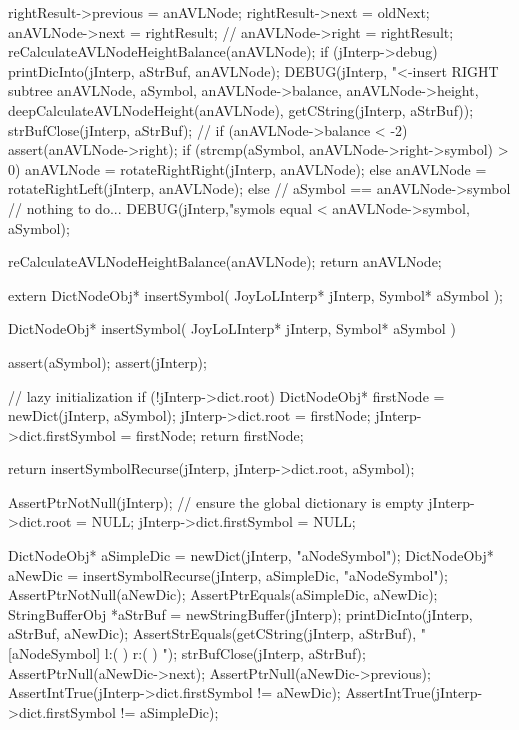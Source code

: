 {{{      rightResult->previous          = anAVLNode;
      rightResult->next              = oldNext;
      anAVLNode->next                = rightResult;
      //
    }
    anAVLNode->right = rightResult;
    reCalculateAVLNodeHeightBalance(anAVLNode);
    if (jInterp->debug) {
      printDicInto(jInterp, aStrBuf, anAVLNode);
      DEBUG(jInterp, "<-insert RIGHT subtree %
          anAVLNode, aSymbol, anAVLNode->balance,
          anAVLNode->height, deepCalculateAVLNodeHeight(anAVLNode),
          getCString(jInterp, aStrBuf));
      strBufClose(jInterp, aStrBuf);
    }
    //
    if (anAVLNode->balance < -2) {
      assert(anAVLNode->right);
      if (strcmp(aSymbol, anAVLNode->right->symbol) > 0) {
        anAVLNode = rotateRightRight(jInterp, anAVLNode);
      } else {
        anAVLNode = rotateRightLeft(jInterp, anAVLNode);
      }
    }
  } else {
    // aSymbol == anAVLNode->symbol // nothing to do...
    DEBUG(jInterp,"symols equal <%
          anAVLNode->symbol, aSymbol);
  }

  reCalculateAVLNodeHeightBalance(anAVLNode);
  return anAVLNode;
}
\stopCCode

\startCHeader
extern DictNodeObj* insertSymbol(
  JoyLoLInterp* jInterp,
  Symbol* aSymbol
);
\stopCHeader
{}

\startCCode
DictNodeObj* insertSymbol(
  JoyLoLInterp* jInterp,
  Symbol* aSymbol
) {
  assert(aSymbol);
  assert(jInterp);

  // lazy initialization
  if (!jInterp->dict.root) {
    DictNodeObj* firstNode = newDict(jInterp, aSymbol);
    jInterp->dict.root        = firstNode;
    jInterp->dict.firstSymbol = firstNode;
    return firstNode;
  }

  return insertSymbolRecurse(jInterp, jInterp->dict.root, aSymbol);
}
\stopCCode

\startCTest
  AssertPtrNotNull(jInterp);
  // ensure the global dictionary is empty
  jInterp->dict.root        = NULL;
  jInterp->dict.firstSymbol = NULL;
  
  DictNodeObj* aSimpleDic = newDict(jInterp, "aNodeSymbol");
  DictNodeObj* aNewDic = insertSymbolRecurse(jInterp, aSimpleDic, "aNodeSymbol");
  AssertPtrNotNull(aNewDic);
  AssertPtrEquals(aSimpleDic, aNewDic);
  StringBufferObj *aStrBuf = newStringBuffer(jInterp);
  printDicInto(jInterp, aStrBuf, aNewDic);
  AssertStrEquals(getCString(jInterp, aStrBuf),
  "[aNodeSymbol] l:(  ) r:(  ) ");
  strBufClose(jInterp, aStrBuf);
  AssertPtrNull(aNewDic->next);
  AssertPtrNull(aNewDic->previous);
  AssertIntTrue(jInterp->dict.firstSymbol != aNewDic);
  AssertIntTrue(jInterp->dict.firstSymbol != aSimpleDic);
\stopCTest
\stopTestCase

